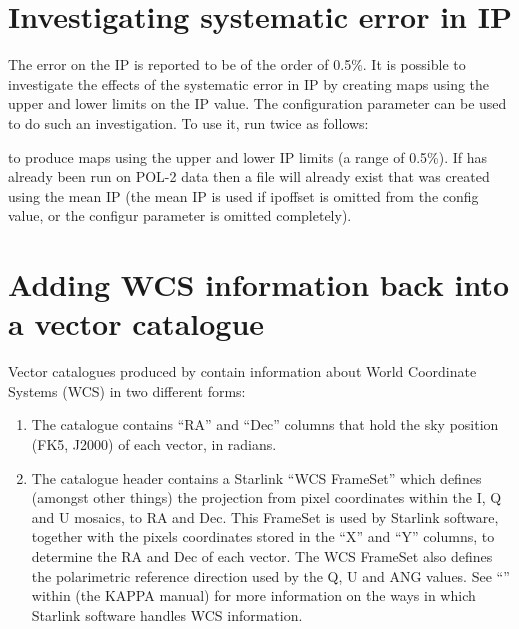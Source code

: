 \section{Investigating systematic error in IP}


The error on the IP is reported to be of the order of 0.5\%.  It is
possible to investigate the effects of the systematic error in IP by
creating maps using the upper and lower limits on the IP value. The
 configuration parameter 
can be used to do such an
investigation. To use it, run  twice as follows:

\begin{terminalv}
\end{terminalv}

to produce maps using the upper and lower IP limits (a range of
0.5\%). If  has already been run on POL-2 data then a file will
already exist that was created using the mean IP (the mean IP is used
if ipoffset is omitted from the config value, or the configur parameter
is omitted completely).



\section{\label{sec:wcscopy}Adding WCS information back into a vector catalogue}
Vector catalogues produced by  contain information about World Coordinate
Systems (WCS) in two different forms:

\begin{enumerate}
\item The catalogue contains ``RA'' and ``Dec'' columns that hold the sky position
(FK5, J2000) of each vector, in radians.
\item The catalogue header contains a Starlink ``WCS FrameSet'' which defines
(amongst other things) the projection from pixel coordinates within the I, Q and
U mosaics, to RA and Dec. This FrameSet is used by Starlink software, together
with the pixels coordinates stored in the ``X'' and ``Y'' columns, to determine
the RA and Dec of each vector. The WCS FrameSet also defines the polarimetric
reference direction used by the Q, U and ANG values. See
``''
within  (the KAPPA manual) for more information on
the ways in which Starlink software handles WCS information.
\end{enumerate}

